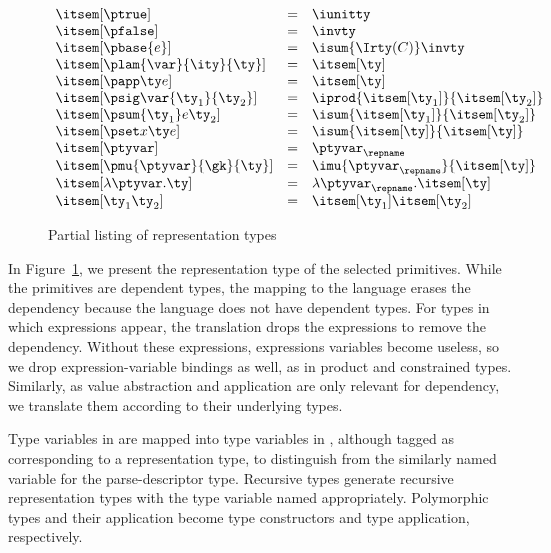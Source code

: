 \begin{figure}
\fbox{$\itsem[\ty] = \ity$}
\[
\begin{array}{lcl} 
\itsem[\ptrue] & = & \iunitty \\
\itsem[\pfalse] & = & \invty \\
\itsem[\pbase{e}] & = & \isum {\Irty(C)} \invty   \\
\itsem[\plam{\var}{\ity}{\ty}] & = & \itsem[\ty] \\
\itsem[\papp \ty e] & = & \itsem[\ty] \\
\itsem[\psig \var {\ty_1} {\ty_2}]  & = & \iprod {\itsem[\ty_1]} {\itsem[\ty_2]}    \\
\itsem[\psum {\ty_1} e {\ty_2}]     & = & \isum {\itsem[\ty_1]} {\itsem[\ty_2]} \\
\itsem[\pset x \ty e] & = & \isum {\itsem[\ty]}{\itsem[\ty]}\\
\itsem[\ptyvar] & = & \ptyvar_\repname \\
\itsem[\pmu{\ptyvar}{\gk}{\ty}] & = & \imu{\ptyvar_\repname}{\itsem[\ty]} \\
\itsem[\lambda \ptyvar.\ty]       & = & \lambda \ptyvar_\repname.\itsem[\ty] \\
\itsem[\ty_1 \ty_2]              & = & \itsem[\ty_1] \itsem[\ty_2] \\
\end{array}
\]
\caption{Partial listing of representation types}
\label{fig:rep-tys}
\end{figure}

In Figure~\ref{fig:rep-tys}, we present the representation type
of the selected \ddc{} primitives. While the primitives are
dependent types, the mapping to the \implang{} language erases the dependency because the \implang{} language does not have dependent types. For \ddc{} types in which expressions appear,
the translation drops the expressions to remove the dependency.
Without these expressions, expressions variables become useless, so we drop 
expression-variable bindings as well, as in product and constrained types.
Similarly, as value abstraction and application are only relevant for
dependency, we translate them according to their underlying
types.

Type variables in \ddc{} are mapped into type variables in \fomega{},
although tagged as corresponding to a representation type, to
distinguish from the similarly named variable for the parse-descriptor
type. Recursive types generate recursive representation types with the type
variable named appropriately. Polymorphic types and their application become type
constructors and type application, respectively.

